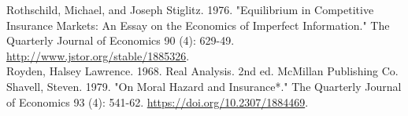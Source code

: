 \documentclass[10pt]{article}
\begin{document}
Rothschild, Michael, and Joseph Stiglitz. 1976. "Equilibrium in Competitive Insurance Markets: An Essay on the Economics of Imperfect Information." The Quarterly Journal of Economics 90 (4): 629-49. \href{http://www.jstor.org/stable/1885326}{http://www.jstor.org/stable/1885326}.\\
Royden, Halsey Lawrence. 1968. Real Analysis. 2nd ed. McMillan Publishing Co. Shavell, Steven. 1979. "On Moral Hazard and Insurance*." The Quarterly Journal of Economics 93 (4): 541-62. \href{https://doi.org/10.2307/1884469}{https://doi.org/10.2307/1884469}.
\end{document}
